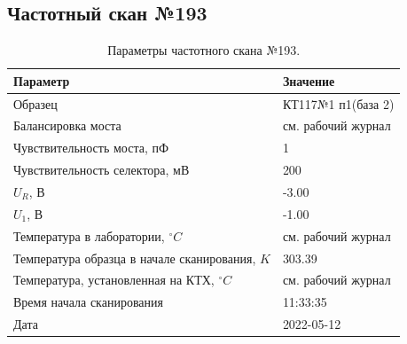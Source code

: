 \subsection{Частотный скан №193}
\begin{table}[!ht]
    \centering
    \caption{Параметры частотного скана №193.}
    \begin{tabular}{|l|l|}
        \hline
        Параметр                                       & Значение                  \\ \hline
        Образец                                        & КТ117№1 п1(база 2)        \\ \hline
        Балансировка моста                             & см. рабочий журнал        \\ \hline
        Чувствительность моста, пФ                     & 1                         \\ \hline
        Чувствительность селектора, мВ                 & 200                       \\ \hline
        $U_R$, В                                       & -3.00                     \\ \hline
        $U_1$, В                                       & -1.00                     \\ \hline
        Температура в лаборатории, $^\circ C$          & см. рабочий журнал        \\ \hline
        Температура образца в начале сканирования, $K$ & 303.39                    \\ \hline
        Температура, установленная на КТХ, $^\circ C$  & см. рабочий журнал        \\ \hline
        Время начала сканирования                      & 11:33:35                  \\ \hline
        Дата                                           & 2022-05-12                \\ \hline
    \end{tabular}
    \label{table:frequency_scan_193}
\end{table}

